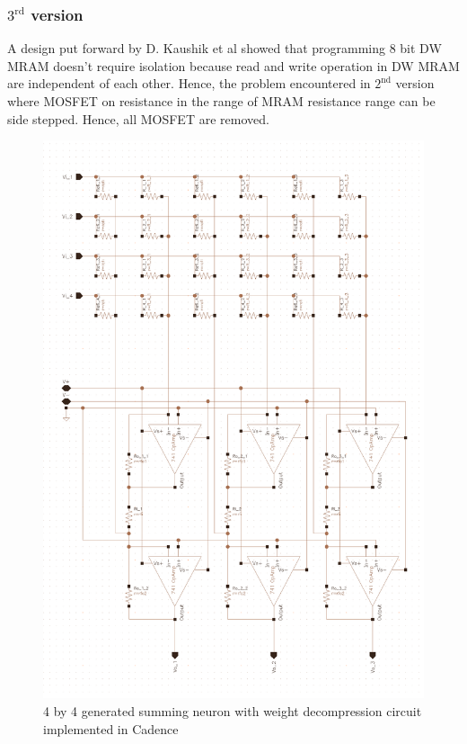\subsubsection{$\text{3}^{\text{rd}}$ version} %
A design put forward by D. Kaushik et al \cite{kaushik} showed that programming 8 bit DW MRAM doesn't require isolation because read and write operation in DW MRAM are independent of each other. Hence, the problem encountered in $\text{2}^{\text{nd}}$ version where MOSFET on resistance in the range of MRAM resistance range can be side stepped. Hence, all MOSFET are removed.
\begin{figure}[H]
	\centering
	\includegraphics[scale=0.4]{version3.png}
	\caption{4 by 4 generated summing neuron with weight decompression circuit implemented in Cadence}
\end{figure}
